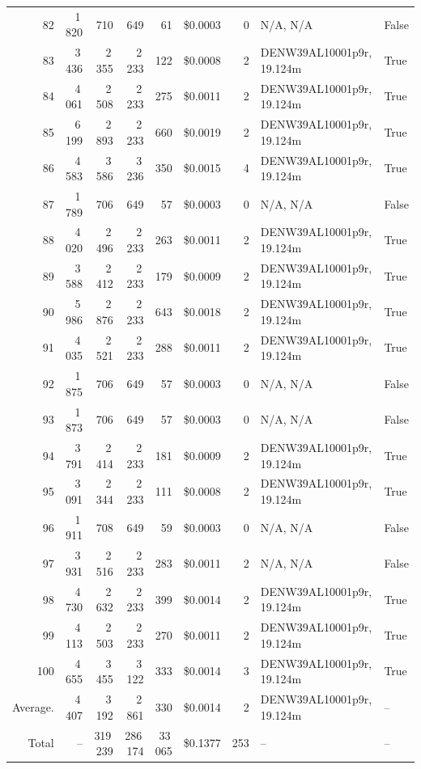 \documentclass[a4paper,11pt]{article}
\begin{document}
\begin{table}[ht]
\begin{tabular}{r r r r r r r p{3cm} l}
82 & 1\,820 & 710 & 649 & 61 & \$0.0003 & 0 & N/A, N/A & False \\
83 & 3\,436 & 2\,355 & 2\,233 & 122 & \$0.0008 & 2 & DENW39AL10001p9r, 19.124m & True \\
84 & 4\,061 & 2\,508 & 2\,233 & 275 & \$0.0011 & 2 & DENW39AL10001p9r, 19.124m & True \\
85 & 6\,199 & 2\,893 & 2\,233 & 660 & \$0.0019 & 2 & DENW39AL10001p9r, 19.124m & True \\
86 & 4\,583 & 3\,586 & 3\,236 & 350 & \$0.0015 & 4 & DENW39AL10001p9r, 19.124m & True \\
87 & 1\,789 & 706 & 649 & 57 & \$0.0003 & 0 & N/A, N/A & False \\
88 & 4\,020 & 2\,496 & 2\,233 & 263 & \$0.0011 & 2 & DENW39AL10001p9r, 19.124m & True \\
89 & 3\,588 & 2\,412 & 2\,233 & 179 & \$0.0009 & 2 & DENW39AL10001p9r, 19.124m & True \\
90 & 5\,986 & 2\,876 & 2\,233 & 643 & \$0.0018 & 2 & DENW39AL10001p9r, 19.124m & True \\
91 & 4\,035 & 2\,521 & 2\,233 & 288 & \$0.0011 & 2 & DENW39AL10001p9r, 19.124m & True \\
92 & 1\,875 & 706 & 649 & 57 & \$0.0003 & 0 & N/A, N/A & False \\
93 & 1\,873 & 706 & 649 & 57 & \$0.0003 & 0 & N/A, N/A & False \\
94 & 3\,791 & 2\,414 & 2\,233 & 181 & \$0.0009 & 2 & DENW39AL10001p9r, 19.124m & True \\
95 & 3\,091 & 2\,344 & 2\,233 & 111 & \$0.0008 & 2 & DENW39AL10001p9r, 19.124m & True \\
96 & 1\,911 & 708 & 649 & 59 & \$0.0003 & 0 & N/A, N/A & False \\
97 & 3\,931 & 2\,516 & 2\,233 & 283 & \$0.0011 & 2 & N/A, N/A & False \\
98 & 4\,730 & 2\,632 & 2\,233 & 399 & \$0.0014 & 2 & DENW39AL10001p9r, 19.124m & True \\
99 & 4\,113 & 2\,503 & 2\,233 & 270 & \$0.0011 & 2 & DENW39AL10001p9r, 19.124m & True \\
100 & 4\,655 & 3\,455 & 3\,122 & 333 & \$0.0014 & 3 & DENW39AL10001p9r, 19.124m & True \\
\hline
Average. & 4\,407 & 3\,192 & 2\,861 & 330 & \$0.0014 & 2 & DENW39AL10001p9r, 19.124m & -- \\
Total & -- & 319\,239 & 286\,174 & 33\,065 & \$0.1377 & 253 & -- & -- \\
\hline
\end{tabular}
\end{table}
\end{document}
